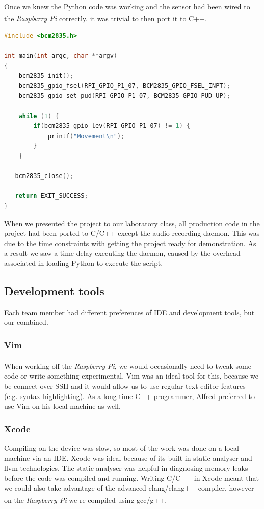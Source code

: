 \documentclass[11pt,a4paper,titlepage]{report}
\newcommand{\rpi}{\textit{Raspberry Pi\textsuperscript{\textregistered}}}
\begin{document}
Once we knew the Python code was working and the sensor had been wired to the \rpi\xspace correctly, it was trivial to then port it to C++.

\begin{lstlisting}[caption={C++ port of PIR-sensor code},label=pir-sensor-test.cpp,language=C++]
#include <bcm2835.h>

int main(int argc, char **argv)
{
    bcm2835_init();
    bcm2835_gpio_fsel(RPI_GPIO_P1_07, BCM2835_GPIO_FSEL_INPT);
    bcm2835_gpio_set_pud(RPI_GPIO_P1_07, BCM2835_GPIO_PUD_UP);

    while (1) {
        if(bcm2835_gpio_lev(RPI_GPIO_P1_07) != 1) {
            printf("Movement\n");
        }
    }

   bcm2835_close();

   return EXIT_SUCCESS;
}
\end{lstlisting}

When we presented the project to our laboratory class, all production code in the project had been ported to C/C++ except the audio recording daemon. This was due to the time constraints with getting the project ready for demonstration. As a result we saw a time delay executing the daemon, caused by the overhead associated in loading Python to execute the script.


\subsection{Development tools}

Each team member had different preferences of IDE and development tools, but our combined.


\subsubsection{Vim}
    When working off the \rpi, we would occasionally need to tweak some code or write something experimental. Vim was an ideal tool for this, because we be connect over SSH and it would allow us to use regular text editor features (e.g. syntax highlighting). As a long time C++ programmer, Alfred preferred to use Vim on his local machine as well.


\subsubsection{Xcode}

      Compiling on the device was slow, so most of the work was done on a local machine via an IDE. Xcode was ideal because of its built in static analyser and llvm technologies. The static analyser was helpful in diagnosing memory leaks before the code was compiled and running. Writing C/C++ in Xcode meant that we could also take advantage of the advanced clang/clang++ compiler, however on the \rpi\xspace we re-compiled using gcc/g++.
\end{document}
